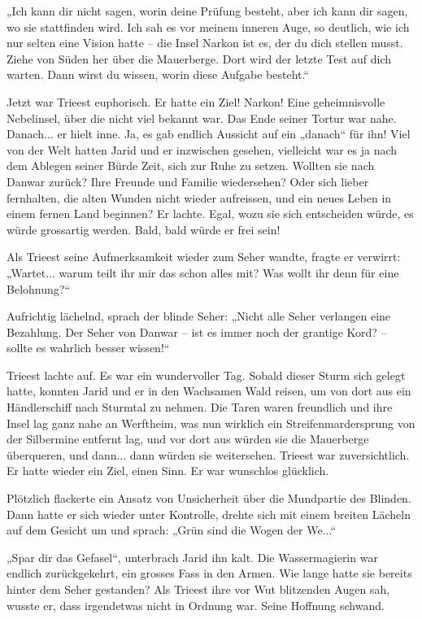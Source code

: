 „Ich kann dir nicht sagen, worin deine Prüfung besteht, aber ich kann dir sagen, wo sie stattfinden wird. Ich sah es vor meinem inneren Auge, so deutlich, wie ich nur selten eine Vision hatte – die Insel Narkon ist es, der du dich stellen musst. Ziehe von Süden her über die Mauerberge. Dort wird der letzte Test auf dich warten. Dann wirst du wissen, worin diese Aufgabe besteht.“

Jetzt war Trieest euphorisch. Er hatte ein Ziel! Narkon! Eine geheimnisvolle Nebelinsel, über die nicht viel bekannt war. Das Ende seiner Tortur war nahe. Danach... er hielt inne. Ja, es gab endlich Aussicht auf ein „danach“ für ihn! Viel von der Welt hatten Jarid und er inzwischen gesehen, vielleicht war es ja nach dem Ablegen seiner Bürde Zeit, sich zur Ruhe zu setzen. Wollten sie nach Danwar zurück? Ihre Freunde und Familie wiedersehen? Oder sich lieber fernhalten, die alten Wunden nicht wieder aufreissen, und ein neues Leben in einem fernen Land beginnen? Er lachte. Egal, wozu sie sich entscheiden würde, es würde grossartig werden. Bald, bald würde er frei sein!

Als Trieest seine Aufmerksamkeit wieder zum Seher wandte, fragte er verwirrt: „Wartet... warum teilt ihr mir das schon alles mit? Was wollt ihr denn für eine Belohnung?“

Aufrichtig lächelnd, sprach der blinde Seher: „Nicht alle Seher verlangen eine Bezahlung. Der Seher von Danwar – ist es immer noch der grantige Kord? – sollte es wahrlich besser wissen!“

Trieest lachte auf. Es war ein wundervoller Tag. Sobald dieser Sturm sich gelegt hatte, konnten Jarid und er in den Wachsamen Wald reisen, um von dort aus ein Händlerschiff nach Sturmtal zu nehmen. Die Taren waren freundlich und ihre Insel lag ganz nahe an Werftheim, was nun wirklich ein Streifenmardersprung von der Silbermine entfernt lag, und vor dort aus würden sie die Mauerberge überqueren, und dann... dann würden sie weitersehen. Trieest war zuversichtlich. Er hatte wieder ein Ziel, einen Sinn. Er war wunschlos glücklich.

Plötzlich flackerte ein Ansatz von Unsicherheit über die Mundpartie des Blinden. Dann hatte er sich wieder unter Kontrolle, drehte sich mit einem breiten Lächeln auf dem Gesicht um und sprach: „Grün sind die Wogen der We...“

„Spar dir das Gefasel“, unterbrach Jarid ihn kalt. Die Wassermagierin war endlich zurückgekehrt, ein grosses Fass in den Armen. Wie lange hatte sie bereits hinter dem Seher gestanden? Als Trieest ihre vor Wut blitzenden Augen sah, wusste er, dass irgendetwas nicht in Ordnung war. Seine Hoffnung schwand.

